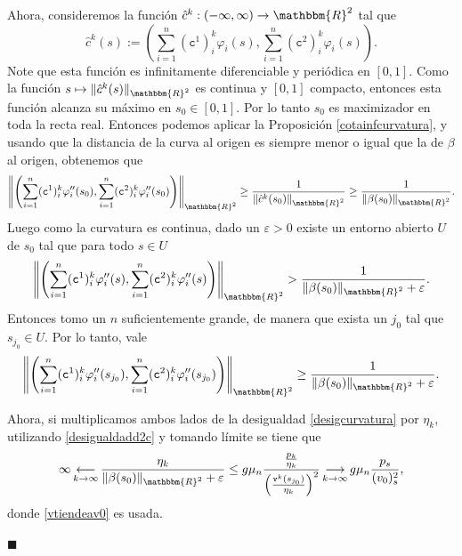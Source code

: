 \documentclass[a4paper,10pt]{book}
\newcommand{\R}{\mathbbm{R}}
\newcommand{\arr}{\rightarrow}
\newenvironment{dem}{\vspace*{-0.1cm}{\it Demostraci\'on:}}{\hfill
$\blacksquare$\\}
\begin{document}
\begin{dem}
Ahora, consideremos la función $\hat{c}^k:(-\infty,\infty)\arr\R^2$ tal que
\[
 \hat{c}^k(s):=\left(\sum_{i=1}^n(\texttt{c}^{1})^k_i\varphi_i(s), \sum_{i=1}^n(\texttt{c}^{2})^k_i\varphi_i(s)\right).
\]
Note que esta función es infinitamente diferenciable y periódica en $[0,1]$. Como la función $s\mapsto\|\hat{c}^k(s)\|_{\R^2}$ es continua y $[0,1]$ compacto, entonces esta función alcanza su máximo en $s_0\in[0,1]$. Por lo tanto $s_0$ es maximizador en toda la recta real. Entonces podemos aplicar la Proposición \ref{cotainfcurvatura}, y usando que la distancia de la curva al origen es siempre menor o igual que la de $\beta$ al origen, obtenemos que 
$$\left\| \left(\sum_{i=1}^n(\texttt{c}^{1})^k_i\varphi_i''(s_0), \sum_{i=1}^n(\texttt{c}^{2})^k_i\varphi_i''(s_0)\right) \right\|_{\R^2}\geq\frac{1}{\left\| \hat{c}^k(s_0) \right\|_{\R^2}}\geq\frac{1}{\|\beta(s_0)\|_{\R^2}}.$$
Luego como la curvatura es continua, dado un $\varepsilon>0$ existe un entorno abierto $U$ de $s_0$ tal que para todo $s\in U$
$$\left\| \left(\sum_{i=1}^n(\texttt{c}^{1})^k_i\varphi_i''(s), \sum_{i=1}^n(\texttt{c}^{2})^k_i\varphi_i''(s)\right) \right\|_{\R^2}>\frac{1}{\|\beta(s_0)\|_{\R^2}+\varepsilon}.$$
Entonces tomo un $n$ suficientemente grande, de manera que exista un $j_0$ tal que $s_{j_0}\in U$. Por lo tanto, vale
\begin{equation}\label{desigcurvatura}
    \left\| \left(\sum_{i=1}^n(\texttt{c}^{1})^k_i\varphi_i''(s_{j_0}), \sum_{i=1}^n(\texttt{c}^{2})^k_i\varphi_i''(s_{j_0})\right) \right\|_{\R^2}\geq\frac{1}{\|\beta(s_0)\|_{\R^2}+ \varepsilon}.
\end{equation}






Ahora, si multiplicamos ambos lados de la desigualdad \eqref{desigcurvatura} por $\eta_k$, utilizando \eqref{desigualdadd2c} y tomando límite se tiene que
\begin{equation}\label{desetapv0}
    \infty\mathop{\longleftarrow}_{k\to\infty}\frac{\eta_k}{\|\beta(s_0)\|_{\R^2}+\varepsilon }\leq g\mu_n\frac{\frac{p_k}{\eta_k}}{\left(\frac{\texttt{v}^k(s_{j_0})}{\eta_k}\right)^2}\mathop{\longrightarrow}_{k\to\infty}g\mu_n\displaystyle\frac{p_s}{(v_0)^2_s},
\end{equation}
donde \eqref{vtiendeav0} es usada.


\end{dem}
\end{document}
